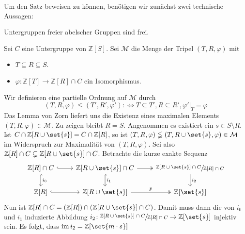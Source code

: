 Um den Satz beweisen zu können, benötigen wir zunächst zwei technische Aussagen:

\begin{lemma}[label=lem:untergrp_frei]
	Untergruppen freier abelscher Gruppen sind frei.
\end{lemma}
\begin{beweis}
	Sei $C$ eine Untergruppe von $\mathbb{Z}[S]$. Sei $\mathcal{M}$ die Menge der Tripel $(T,R,\varphi)$ mit
	\begin{itemize}
		\item $T \subseteq R \subseteq S$.
		\item $\varphi \colon \mathbb{Z}[T] \to \mathbb{Z}[R] \cap C$ ein Isomorphismus.
	\end{itemize}
	Wir definieren eine partielle Ordnung auf $\mathcal{M}$ durch
	\[
		(T,R,\varphi) \le (T',R',\varphi') :\iff T \subseteq T', R \subseteq R', \varphi'|_{T}=\varphi
	\]
	Das Lemma von Zorn liefert uns die Existenz eines maximalen Elements $(T,R,\varphi) \in \mathcal{M}$. Zu zeigen bleibt $R=S$. Angenommen es existiert ein $s \in S \setminus R$.
	Ist $C \cap \mathbb{Z}[R \cup \set{s}] = C \cap \mathbb{Z}[R]$, so ist $(T,R,\varphi) \lneqq (T,R \cup \set{s},\varphi) \in \mathcal{M}$ im Widerspruch zur Maximalität von 
	$(T,R,\varphi)$. Sei also $\mathbb{Z}[R] \cap C \subsetneq \mathbb{Z}[R \cup \set{s}] \cap C$. Betrachte die kurze exakte Sequenz 
	\[
		\begin{tikzcd}
			\mathbb{Z}[R] \cap C \rar[hook] \dar[hook,"i_0"]& \mathbb{Z}[R \cup \set{s}] \cap C \rar[two heads] \dar[hook,"i_1"] & \sfrac{\mathbb{Z}[R \cup \set{s}] \cap C}{\mathbb{Z}[R] \cap C} 
			\dar["i_2"] \\
			\mathbb{Z}[R] \rar[hook] & \mathbb{Z}\benbrace*{R \cup \set{s}} \rar[two heads,"p"] & \mathbb{Z}\benbrace*{\set{s}}
		\end{tikzcd}
	\]
	Nun ist $\mathbb{Z}[R] \cap C  = (\mathbb{Z}[R]) \cap \enbrace*{\mathbb{Z}[R \cup \set{s}] \cap C}$. Damit muss dann die von $i_0$ und $i_1$ induzierte Abbildung 
	$i_2 \colon \sfrac{\mathbb{Z}[R \cup \set{s}] \cap C}{\mathbb{Z}[R] \cap C} \to \mathbb{Z}[\set{s}]$ injektiv sein. Es folgt, dass $\im i_2 = \mathbb{Z}\benbrace*{\set{m \cdot s}}$

\end{beweis}
